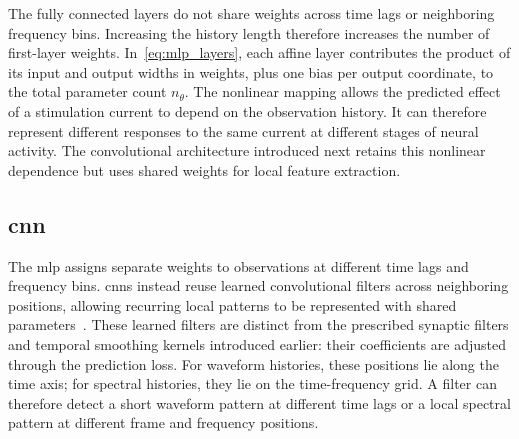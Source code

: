 The fully connected layers do not share weights across time lags or neighboring frequency bins.
Increasing the history length therefore increases the number of first-layer weights.
In~\eqref{eq:mlp_layers}, each affine layer contributes the product of its input and output widths in weights, plus one bias per output coordinate, to the total parameter count $n_\theta$.
The nonlinear mapping allows the predicted effect of a stimulation current to depend on the observation history.
It can therefore represent different responses to the same current at different stages of neural activity.
The convolutional architecture introduced next retains this nonlinear dependence but uses shared weights for local feature extraction.


\subsection{\acs{cnn}}

The \ac{mlp} assigns separate weights to observations at different time lags and frequency bins.
\Acp{cnn} instead reuse learned convolutional filters across neighboring positions, allowing recurring local patterns to be represented with shared parameters~\cite{Goodfellow2016}.
These learned filters are distinct from the prescribed synaptic filters and temporal smoothing kernels introduced earlier: their coefficients are adjusted through the prediction loss.
For waveform histories, these positions lie along the time axis; for spectral histories, they lie on the time-frequency grid.
A filter can therefore detect a short waveform pattern at different time lags or a local spectral pattern at different frame and frequency positions.

